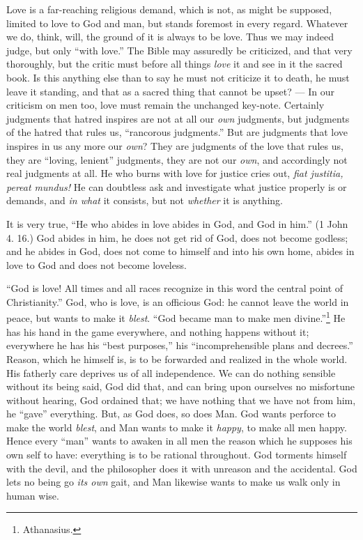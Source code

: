 Love is a far-reaching religious demand, which is not, as might be supposed, 
limited to love to God and man, but stands foremost in every regard. Whatever 
we do, think, will, the ground of it is always to be love. Thus we may indeed 
judge, but only ``with love.'' The Bible may assuredly be criticized, and 
that very thoroughly, but the critic must before all things \textit{love} it 
and see in it the sacred book. Is this anything else than to say he must not 
criticize it to death, he must leave it standing, and that as a sacred thing 
that cannot be upset? --- In our criticism on men too, love must remain the 
unchanged key-note. Certainly judgments that hatred inspires are not at all 
our \textit{own} judgments, but judgments of the hatred that rules us, 
``rancorous judgments.'' But are judgments that love inspires in us any more 
our \textit{own}? They are judgments of the love that rules us, they are 
``loving, lenient'' judgments, they are not our \textit{own}, and 
accordingly not real judgments at all. He who burns with love for justice 
cries out, \textit{fiat justitia, pereat mundus!} He can doubtless ask and 
investigate what justice properly is or demands, and \textit{in what} it 
consists, but not \textit{whether} it is anything.

It is very true, ``He who abides in love abides in God, and God in him.'' (1 
John 4. 16.) God abides in him, he does not get rid of God, does not become 
godless; and he abides in God, does not come to himself and into his own home, 
abides in love to God and does not become loveless.

``God is love! All times and all races recognize in this word the central 
point of Christianity.'' God, who is love, is an officious God: he cannot 
leave the world in peace, but wants to make it \textit{blest}. ``God became 
man to make men divine.''\footnote{Athanasius.} He has his hand in the game 
everywhere, and nothing happens without it; everywhere he has his ``best 
purposes,'' his ``incomprehensible plans and decrees.'' Reason, which he 
himself is, is to be forwarded and realized in the whole world. His fatherly 
care deprives us of all independence. We can do nothing sensible without its 
being said, God did that, and can bring upon ourselves no misfortune without 
hearing, God ordained that; we have nothing that we have not from him, he 
``gave'' everything. But, as God does, so does Man. God wants perforce to 
make the world \textit{blest}, and Man wants to make it \textit{happy}, to 
make all men happy. Hence every ``man'' wants to awaken in all men the 
reason which he supposes his own self to have: everything is to be rational 
throughout. God torments himself with the devil, and the philosopher does it 
with unreason and the accidental. God lets no being go \textit{its own} gait, 
and Man likewise wants to make us walk only in human wise.

